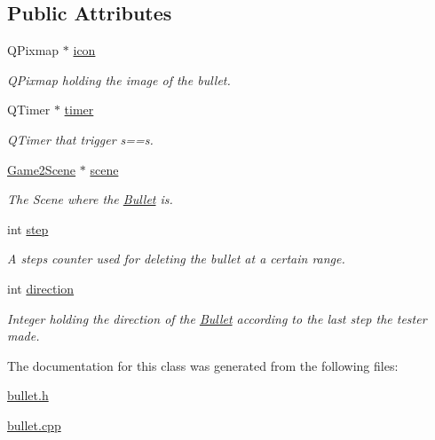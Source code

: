 \subsection*{Public Attributes}
\begin{DoxyCompactItemize}
\item 
\hypertarget{classBullet_a48eb70e610461e300887a88aa8796ed4}{Q\-Pixmap $\ast$ \hyperlink{classBullet_a48eb70e610461e300887a88aa8796ed4}{icon}}\label{classBullet_a48eb70e610461e300887a88aa8796ed4}

\begin{DoxyCompactList}\small\item\em Q\-Pixmap holding the image of the bullet. \end{DoxyCompactList}\item 
\hypertarget{classBullet_a4958d1db2c416074d65eee3e3bc8fff5}{Q\-Timer $\ast$ \hyperlink{classBullet_a4958d1db2c416074d65eee3e3bc8fff5}{timer}}\label{classBullet_a4958d1db2c416074d65eee3e3bc8fff5}

\begin{DoxyCompactList}\small\item\em Q\-Timer that trigger s==s. \end{DoxyCompactList}\item 
\hypertarget{classBullet_aeadd62cc1ee5aa7ce5fecdbe1f8685ed}{\hyperlink{classGame2Scene}{Game2\-Scene} $\ast$ \hyperlink{classBullet_aeadd62cc1ee5aa7ce5fecdbe1f8685ed}{scene}}\label{classBullet_aeadd62cc1ee5aa7ce5fecdbe1f8685ed}

\begin{DoxyCompactList}\small\item\em The Scene where the \hyperlink{classBullet}{Bullet} is. \end{DoxyCompactList}\item 
\hypertarget{classBullet_a1a42b91927f84b3bb1170f3cd5855a14}{int \hyperlink{classBullet_a1a42b91927f84b3bb1170f3cd5855a14}{step}}\label{classBullet_a1a42b91927f84b3bb1170f3cd5855a14}

\begin{DoxyCompactList}\small\item\em A steps counter used for deleting the bullet at a certain range. \end{DoxyCompactList}\item 
\hypertarget{classBullet_a368daaff6965adc373d8fec654e29ef0}{int \hyperlink{classBullet_a368daaff6965adc373d8fec654e29ef0}{direction}}\label{classBullet_a368daaff6965adc373d8fec654e29ef0}

\begin{DoxyCompactList}\small\item\em Integer holding the direction of the \hyperlink{classBullet}{Bullet} according to the last step the tester made. \end{DoxyCompactList}\end{DoxyCompactItemize}


The documentation for this class was generated from the following files\-:\begin{DoxyCompactItemize}
\item 
\hyperlink{bullet_8h}{bullet.\-h}\item 
\hyperlink{bullet_8cpp}{bullet.\-cpp}\end{DoxyCompactItemize}
